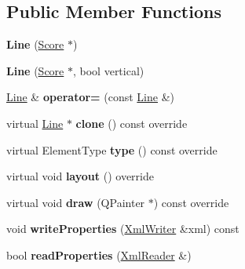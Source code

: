 \subsection*{Public Member Functions}
\begin{DoxyCompactItemize}
\item 
\mbox{\label{class_ms_1_1_line_ae98437cacd93633ed44694b182c5dcf5}} 
{\bfseries Line} (\hyperlink{class_ms_1_1_score}{Score} $\ast$)
\item 
\mbox{\label{class_ms_1_1_line_a30a5617da16a1010fede62142bae19f8}} 
{\bfseries Line} (\hyperlink{class_ms_1_1_score}{Score} $\ast$, bool vertical)
\item 
\mbox{\label{class_ms_1_1_line_a335f43ce38a25b86129dd57d39666f26}} 
\hyperlink{class_ms_1_1_line}{Line} \& {\bfseries operator=} (const \hyperlink{class_ms_1_1_line}{Line} \&)
\item 
\mbox{\label{class_ms_1_1_line_afde5f804b4e24b7039835c6907973848}} 
virtual \hyperlink{class_ms_1_1_line}{Line} $\ast$ {\bfseries clone} () const override
\item 
\mbox{\label{class_ms_1_1_line_a460233c47f12fcf3bafc1ae453d9058c}} 
virtual Element\+Type {\bfseries type} () const override
\item 
\mbox{\label{class_ms_1_1_line_a197d0bbfd060204133d955a9eb145f06}} 
virtual void {\bfseries layout} () override
\item 
\mbox{\label{class_ms_1_1_line_a1dcccac413105f6d46a17967d713c761}} 
virtual void {\bfseries draw} (Q\+Painter $\ast$) const override
\item 
\mbox{\label{class_ms_1_1_line_aa4ece97acb2a56916b8b4020344b3260}} 
void {\bfseries write\+Properties} (\hyperlink{class_ms_1_1_xml_writer}{Xml\+Writer} \&xml) const
\item 
\mbox{\label{class_ms_1_1_line_a941e3f3e90701eea0ad674790bf61bee}} 
bool {\bfseries read\+Properties} (\hyperlink{class_ms_1_1_xml_reader}{Xml\+Reader} \&)
\item 

\end{DoxyCompactItemize}
